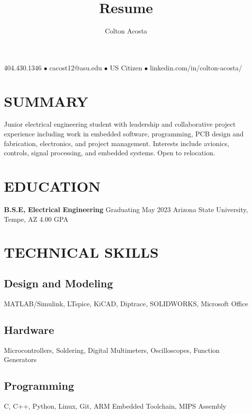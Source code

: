 \documentclass{article}
\makeatletter
\renewcommand{\maketitle}{
	\begin{center}
		{\huge\bfseries
			\theauthor}
			
		404.430.1346 $\bullet$ cacost12@asu.edu $\bullet$ US Citizen $\bullet$ linkedin.com/in/colton-acosta/
	\end{center}
}
\makeatother
\begin{document}
\title{Resume}
\author{Colton Acosta}
\maketitle
\section{SUMMARY}
Junior electrical engineering student with leadership and collaborative project  experience including work in embedded software, programming, PCB design and fabrication, electronics, and project management. Interests include avionics, controls, signal processing, and embedded systems. Open to relocation.
\section{EDUCATION}
\textbf{B.S.E, Electrical Engineering}
\hfill 
Graduating May 2023
\linebreak
Arizona State University, Tempe, AZ 
\hfill
4.00 GPA

\section{TECHNICAL SKILLS}
\subsection{Design and Modeling}
MATLAB/Simulink, LTspice, KiCAD, Diptrace, SOLIDWORKS, Microsoft Office
\subsection{Hardware}
Microcontrollers, Soldering, Digital Multimeters, Oscilloscopes, Function Generators
\subsection{Programming} 
C, C++, Python, Linux, Git, ARM Embedded Toolchain, MIPS Assembly
\end{document}

